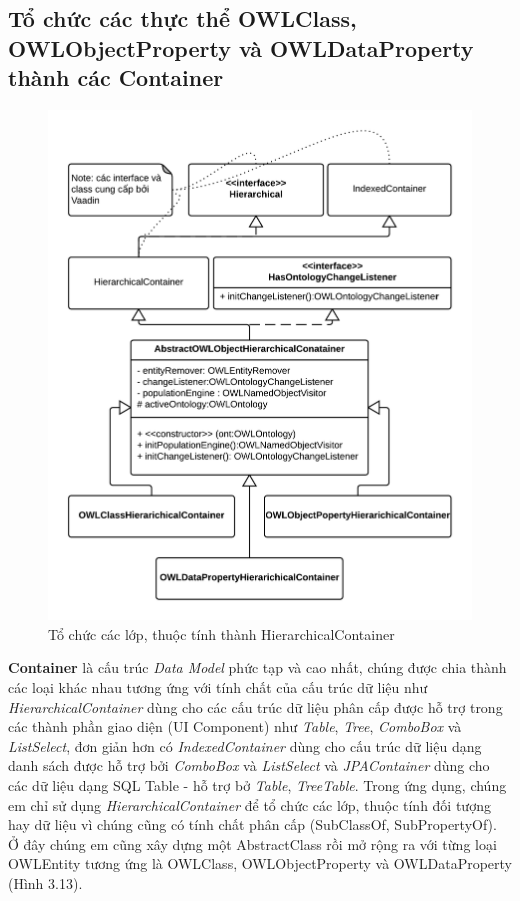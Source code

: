 {\subsection{Tổ chức các thực thể OWLClass, OWLObjectProperty và OWLDataProperty thành các Container}
\begin{figure}[h!]
	\centering
	\includegraphics[width=150mm]{Figures/uml_owleditor_abstractcontainer_nobackground.png}
	\caption{Tổ chức các lớp, thuộc tính thành HierarchicalContainer \label{overflow}}
\end{figure}
\textbf{Container} là cấu trúc \textit{Data Model} phức tạp và cao nhất, chúng được chia thành các loại khác nhau tương ứng với tính chất của cấu trúc dữ liệu như \textit{HierarchicalContainer} dùng cho các cấu trúc dữ liệu phân cấp được hỗ trợ trong các thành phần giao diện (UI Component) như \textit{Table}, \textit{Tree}, \textit{ComboBox} và \textit{ListSelect}, đơn giản hơn có \textit{IndexedContainer} dùng cho cấu trúc dữ liệu dạng danh sách được hỗ trợ bởi \textit{ComboBox} và \textit{ListSelect} và \textit{JPAContainer} dùng cho các dữ liệu dạng SQL Table - hỗ trợ bở \textit{Table}, \textit{TreeTable}. Trong ứng dụng, chúng em chỉ sử dụng \textit{HierarchicalContainer} để tổ chức các lớp, thuộc tính đối tượng hay dữ liệu vì chúng cũng có tính chất phân cấp (SubClassOf, SubPropertyOf). Ở đây chúng em cũng xây dựng một AbstractClass rồi mở rộng ra với từng loại OWLEntity tương ứng là OWLClass, OWLObjectProperty và OWLDataProperty (Hình 3.13).

}
